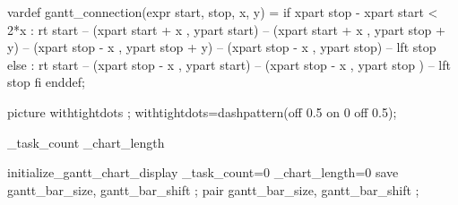 

\unprotect


\startMPinitializations
  vardef gantt_connection(expr start, stop, x, y) = 
    if xpart stop - xpart start < 2*x :
      rt start -- 
      (xpart start + x , ypart start) -- 
      (xpart start + x , ypart stop + y) -- 
      (xpart stop - x  , ypart stop + y) -- 
      (xpart stop - x  , ypart stop) -- 
      lft stop 
    else :
      rt start -- 
      (xpart stop - x , ypart start) -- 
      (xpart stop - x , ypart stop ) -- 
      lft stop 
    fi 
  enddef;

  picture withtightdots ;
  withtightdots=dashpattern(off 0.5 on 0 off 0.5); %
\stopMPinitializations

\newcount\gantt_task_count
\newcount\gantt_chart_length

\starttexdefinition initialize_gantt_chart_display
   \gantt_task_count=0
   \gantt_chart_length=0
   \resetMPdrawing
   \startMPdrawing
     save gantt_bar_size, gantt_bar_shift ;
     pair gantt_bar_size, gantt_bar_shift ;
      

